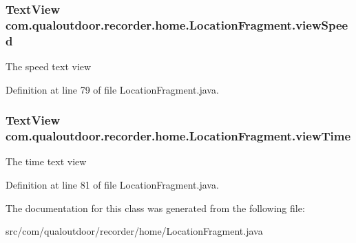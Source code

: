 \hypertarget{classcom_1_1qualoutdoor_1_1recorder_1_1home_1_1LocationFragment_acb60fef2aa9baee7c8e611d835492868}{
\subsubsection[{view\-Speed}]{\setlength{\rightskip}{0pt plus 5cm}Text\-View com.\-qualoutdoor.\-recorder.\-home.\-Location\-Fragment.\-view\-Speed\hspace{0.3cm}{\ttfamily [private]}}}\label{classcom_1_1qualoutdoor_1_1recorder_1_1home_1_1LocationFragment_acb60fef2aa9baee7c8e611d835492868}
The speed text view 

Definition at line 79 of file Location\-Fragment.\-java.

\hypertarget{classcom_1_1qualoutdoor_1_1recorder_1_1home_1_1LocationFragment_aa713236e64c21130b09b015bd1b75b00}{
\subsubsection[{view\-Time}]{\setlength{\rightskip}{0pt plus 5cm}Text\-View com.\-qualoutdoor.\-recorder.\-home.\-Location\-Fragment.\-view\-Time\hspace{0.3cm}{\ttfamily [private]}}}\label{classcom_1_1qualoutdoor_1_1recorder_1_1home_1_1LocationFragment_aa713236e64c21130b09b015bd1b75b00}
The time text view 

Definition at line 81 of file Location\-Fragment.\-java.



The documentation for this class was generated from the following file\-:\begin{DoxyCompactItemize}
\item 
src/com/qualoutdoor/recorder/home/Location\-Fragment.\-java\end{DoxyCompactItemize}
